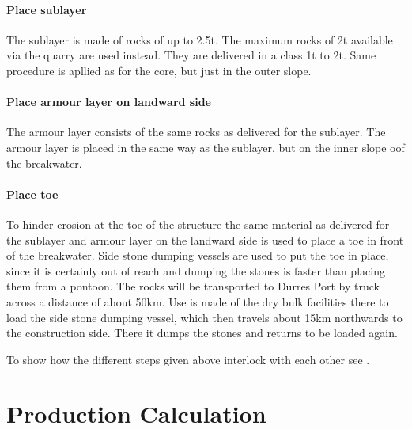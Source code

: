 \paragraph{Place sublayer}
The sublayer is made of rocks of up to 2.5t.
The maximum rocks of 2t available via the quarry are used instead.
They are delivered in a class 1t to 2t.
Same procedure is apllied as for the core, but just in the outer slope.

\paragraph{Place armour layer on landward side}
The armour layer consists of the same rocks as delivered for the sublayer.
The armour layer is placed in the same way as the sublayer, but on the inner slope oof the breakwater.

\paragraph{Place toe}
To hinder erosion at the toe of the structure the same material as delivered for the sublayer and armour layer on the landward side is used to place a toe in front of the breakwater.
Side stone dumping vessels are used to put the toe in place, since it is certainly out of reach and dumping the stones is faster than placing them from a pontoon.
The rocks will be transported to Durres Port by truck across a distance of about 50km.
Use is made of the dry bulk facilities there to load the side stone dumping vessel, which then travels about 15km northwards to the construction side.
There it dumps the stones and returns to be loaded again.


To show how the different steps given above interlock with each other see .

\section{Production Calculation}